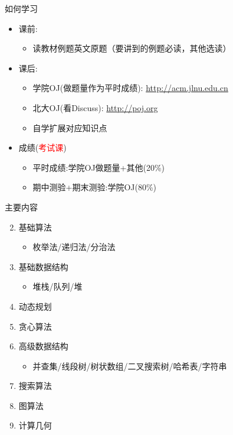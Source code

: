 \begin{frame}{如何学习}
    \begin{itemize}
        \item 课前:
        \begin{itemize}
            \item 读教材例题英文原题（要讲到的例题必读，其他选读）
        \end{itemize}
        \vfill
        \item 课后:
        \begin{itemize}
            \item 学院OJ(做题量作为平时成绩): \url{http://acm.jlnu.edu.cn}
            \item 北大OJ(看Discuss): \url{http://poj.org}
            \item 自学扩展对应知识点
        \end{itemize}
        \vfill
        \item 成绩(\textcolor{red}{考试课})
        \begin{itemize}
            \item 平时成绩:学院OJ做题量+其他(20\%)
            \item 期中测验+期末测验:学院OJ(80\%)
        \end{itemize}
    \end{itemize}
\end{frame}
\begin{frame}{主要内容}
    \begin{enumerate}
    \setcounter{enumi}{1}
        \item 基础算法
        \begin{itemize}
            \item 枚举法/递归法/分治法
        \end{itemize}
        \item 基础数据结构
        \begin{itemize}
            \item 堆栈/队列/堆
        \end{itemize}
        \item 动态规划
        \item 贪心算法
        \item 高级数据结构
        \begin{itemize}
            \item 并查集/线段树/树状数组/二叉搜索树/哈希表/字符串
        \end{itemize}
        \item 搜索算法
        \item 图算法
        \item 计算几何
    \end{enumerate}
\end{frame}
